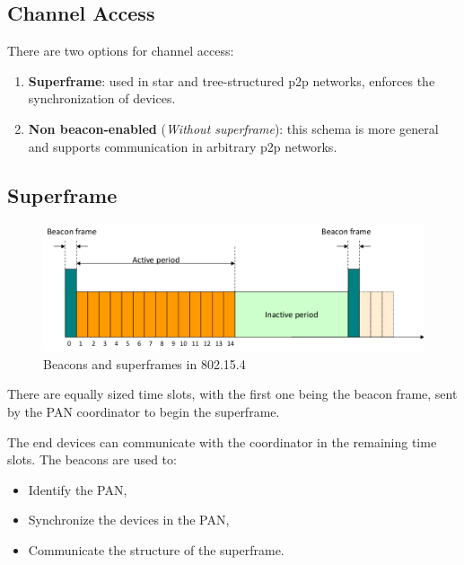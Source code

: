 \begin{itemize}
\section{Channel Access}
There are two options for channel access:
\begin{enumerate}
   \item \textbf{Superframe}:
   used in star and tree-structured p2p networks, enforces the synchronization of devices.
   \item \textbf{Non beacon-enabled} (\textit{Without superframe}):
   this schema is more general and supports communication in arbitrary p2p networks.
\end{enumerate}

\subsection{Superframe}
\begin{figure}[htbp]
   \centering
   \includegraphics{images/802_superframe_beacon.png}
   \caption{Beacons and superframes in 802.15.4}
   \label{fig:802_superframe_beacon}
\end{figure}

There are equally sized time slots, with the first one being the beacon frame, sent by the PAN coordinator to begin the superframe.

The end devices can communicate with the coordinator in the
remaining time slots.
The beacons are used to:
\begin{itemize}
   \item Identify the PAN,
   \item Synchronize the devices in the PAN,
   \item Communicate the structure of the superframe.
\end{itemize}


\end{itemize}
